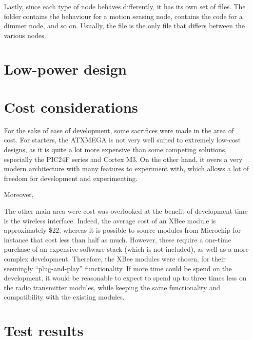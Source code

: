 Lastly, since each type of node behaves differently, it has its own set of
files. The  folder contains the behaviour for a motion
sensing node,  contains the code for a dimmer node, and so
on. Usually, the  file is the only file that differs between the
various nodes.

\section{Low-power design}

\section{Cost considerations}

For the sake of ease of development, some sacrifices were made in the area of
cost. For starters, the ATXMEGA is not very well suited to extremely low-cost
designs, as it is quite a lot more expensive than some competing solutions,
especially the PIC24F series and Cortex M3. On the other hand, it overs a very
modern architecture with many features to experiment with, which allows a lot of
freedom for development and experimenting.

Moreover,

The other main area were cost was overlooked at the benefit of development time
is the wireless interface. Indeed, the average cost of an XBee module is
approximately \$22, whereas it is possible to source modules from Microchip for
instance that cost less than half as much. However, these require a one-time
purchase of an expensive software stack (which is not included), as well as a
more complex development. Therefore, the XBee modules were chosen, for their
seemingly ``plug-and-play'' functionality. If more time could be spend on the
development, it would be reasonable to expect to spend up to three times less on
the radio transmitter modules, while keeping the same functionality and
compatibility with the existing modules.


\section{Test results}

